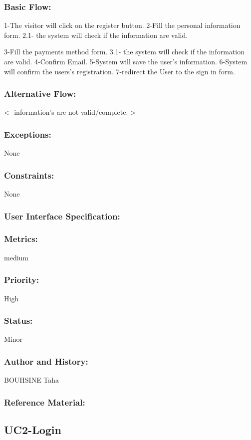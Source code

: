 \documentclass[11pt, openany]{report}
\begin{document}
\subsubsection{Basic Flow:}
1-The visitor will click on the register button.
2-Fill the personal information form.
  2.1- the system will check if the information are valid.

3-Fill the payments method form.
  3.1- the system will check if the information are valid.
4-Confirm Email.
5-System will save the user's information.
6-System will confirm the users's registration.
7-redirect the User to the sign in form.
\subsubsection{Alternative Flow:}
< -information's are not valid/complete. >
\subsubsection{Exceptions:}
None
\subsubsection{Constraints:}
None
\subsubsection{User Interface Specification:}
\subsubsection{Metrics:}
medium
\subsubsection{Priority:}
High
\subsubsection{Status:}
Minor
\subsubsection{Author and History:}
BOUHSINE Taha
\subsubsection{Reference Material:}


\subsection{UC2-Login}
\label{UC2}
\end{document}
